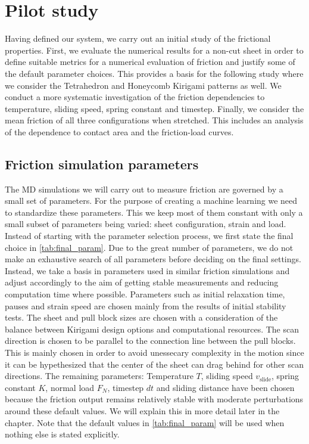
\chapter{Pilot study}\label{chap:pilot_study}

Having defined our system, we carry out an initial study of the frictional properties. First, we evaluate the numerical results for a non-cut sheet in order to define suitable metrics for a numerical evaluation of friction and justify some of the default parameter choices. This provides a basis for the following study where we consider the Tetrahedron and Honeycomb Kirigami patterns as well. We conduct a more systematic investigation of the friction dependencies to temperature, sliding speed, spring constant and timestep. Finally, we consider the mean friction of all three configurations when stretched. This includes an analysis of the dependence to contact area and the friction-load curves. 


\section{Friction simulation parameters}
The \acrshort{MD} simulations we will carry out to measure friction are governed
by a small set of parameters. For the purpose of creating a machine learning we
need to standardize these parameters. This we keep most of them constant with
only a small subset of parameters being varied: sheet configuration, strain and
load. Instead of starting with the parameter selection process, we first state
the final choice in \cref{tab:final_param}. Due to the great number of
parameters, we do not make an exhaustive search of all parameters before
deciding on the final settings. Instead, we take a basis in parameters used in
similar friction simulations \cite{li_evolving_2016, Yoon2015MolecularDS,
liu_high-speed_2014, zhu_study_2018, ma12091425} and adjust accordingly to the
aim of getting stable measurements and reducing computation time where possible.
Parameters such as initial relaxation time, pauses and strain speed are chosen
mainly from the results of initial stability tests. The sheet and pull block
sizes are chosen with a consideration of the balance between Kirigami design
options and computational resources. The scan direction is chosen to be parallel
to the connection line between the pull blocks. This is mainly chosen in order
to avoid unessecary complexity in the motion since it can be hypethesized that the
center of the sheet can drag behind for other scan directions. The remaining
parameters: Temperature $T$, sliding speed $v_{\text{slide}}$, spring constant
$K$, normal load $F_N$, timestep $dt$ and sliding distance have been chosen
because the friction output remains relatively stable with moderate
perturbations around these default values. We will explain this in more detail
later in the chapter. Note that the default values in \cref{tab:final_param}
will be used when nothing else is stated explicitly.


